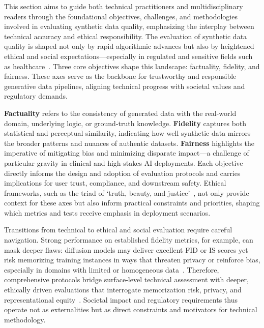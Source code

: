 \documentclass[sigconf]{acmart}
\begin{document}
This section aims to guide both technical practitioners and multidisciplinary readers through the foundational objectives, challenges, and methodologies involved in evaluating synthetic data quality, emphasizing the interplay between technical accuracy and ethical responsibility. The evaluation of synthetic data quality is shaped not only by rapid algorithmic advances but also by heightened ethical and social expectations—especially in regulated and sensitive fields such as healthcare~\cite{ref87}\cite{ref88}\cite{ref89}. Three core objectives shape this landscape: factuality, fidelity, and fairness. These axes serve as the backbone for trustworthy and responsible generative data pipelines, aligning technical progress with societal values and regulatory demands.

\textbf{Factuality} refers to the consistency of generated data with the real-world domain, underlying logic, or ground-truth knowledge. \textbf{Fidelity} captures both statistical and perceptual similarity, indicating how well synthetic data mirrors the broader patterns and nuances of authentic datasets. \textbf{Fairness} highlights the imperative of mitigating bias and minimizing disparate impact—a challenge of particular gravity in clinical and high-stakes AI deployments. Each objective directly informs the design and adoption of evaluation protocols and carries implications for user trust, compliance, and downstream safety. Ethical frameworks, such as the triad of `truth, beauty, and justice’~\cite{ref87}, not only provide context for these axes but also inform practical constraints and priorities, shaping which metrics and tests receive emphasis in deployment scenarios.

Transitions from technical to ethical and social evaluation require careful navigation. Strong performance on established fidelity metrics, for example, can mask deeper flaws: diffusion models may deliver excellent FID or IS scores yet risk memorizing training instances in ways that threaten privacy or reinforce bias, especially in domains with limited or homogeneous data~\cite{ref21}\cite{ref87}\cite{ref95}. Therefore, comprehensive protocols bridge surface-level technical assessment with deeper, ethically driven evaluations that interrogate memorization risk, privacy, and representational equity~\cite{ref3}\cite{ref87}\cite{ref88}. Societal impact and regulatory requirements thus operate not as externalities but as direct constraints and motivators for technical methodology.
\end{document}
